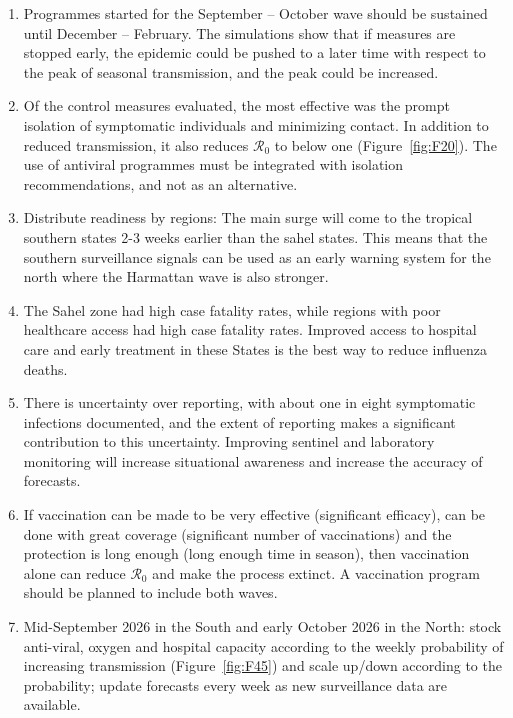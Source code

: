 \documentclass[12pt,a4paper]{article}
\theoremstyle{definition}
\theoremstyle{remark}
\begin{document}
\begin{enumerate}[label=(\roman*)]
\item Programmes started for the September – October wave should be sustained until December – February. The simulations show that if measures are stopped early, the epidemic could be pushed to a later time with respect to the peak of seasonal transmission, and the peak could be increased.
\item Of the control measures evaluated, the most effective was the prompt isolation of symptomatic individuals and minimizing contact. In addition to reduced transmission, it also reduces $\mathcal{R}_0$ to below one (Figure~\ref{fig:F20}). The use of antiviral programmes must be integrated with isolation recommendations, and not as an alternative.
\item Distribute readiness by regions: The main surge will come to the tropical southern states 2-3 weeks earlier than the sahel states. This means that the southern surveillance signals can be used as an early warning system for the north where the Harmattan wave is also stronger.

\item The Sahel zone had high case fatality rates, while regions with poor healthcare access had high case fatality rates. Improved access to hospital care and early treatment in these States is the best way to reduce influenza deaths.
\item There is uncertainty over reporting, with about one in eight symptomatic infections documented, and the extent of reporting makes a significant contribution to this uncertainty. Improving sentinel and laboratory monitoring will increase situational awareness and increase the accuracy of forecasts.
\item If vaccination can be made to be very effective (significant efficacy), can be done with great coverage (significant number of vaccinations) and the protection is long enough (long enough time in season), then vaccination alone can reduce $\mathcal{R}_0$ and make the process extinct. A vaccination program should be planned to include both waves.

\item Mid-September 2026 in the South and early October 2026 in the North: stock anti-viral, oxygen and hospital capacity according to the weekly probability of increasing transmission (Figure~\ref{fig:F45}) and scale up/down according to the probability; update forecasts every week as new surveillance data are available.
\end{enumerate}
\end{document}
